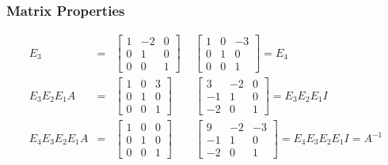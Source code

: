 \documentclass[notheorems,mathserif,table,compress]{beamer}  %
\begin{document}
\begin{frame}
\frametitle{Matrix Properties}
\begin{eqnarray*}
E_3&=&
\begin{bmatrix}
1 & -2 & 0\\
0 & 1 & 0\\
0 & 0 & 1
\end{bmatrix} \quad \,
\begin{bmatrix}
1 & 0 & -3\\
0 & 1 & 0\\
0 & 0 & 1
\end{bmatrix}
=E_4\\
E_3E_2E_1A&=&
\begin{bmatrix}
1 & 0 & 3\\
0 & 1 & 0\\
0 & 0 & 1
\end{bmatrix} \qquad
\begin{bmatrix}
3 & -2 & 0\\
-1 & 1 & 0\\
-2 & 0 & 1
\end{bmatrix} 
=E_3E_2E_1I\\
E_4E_3E_2E_1A&=&
\begin{bmatrix}
1 & 0 & 0\\
0 & 1 & 0\\
0 & 0 & 1
\end{bmatrix} \qquad
\begin{bmatrix}
9 & -2 & -3\\
-1 & 1 & 0\\
-2 & 0 & 1
\end{bmatrix} 
=E_4E_3E_2E_1I=A^{-1}
\end{eqnarray*}

\end{frame}
\end{document}
